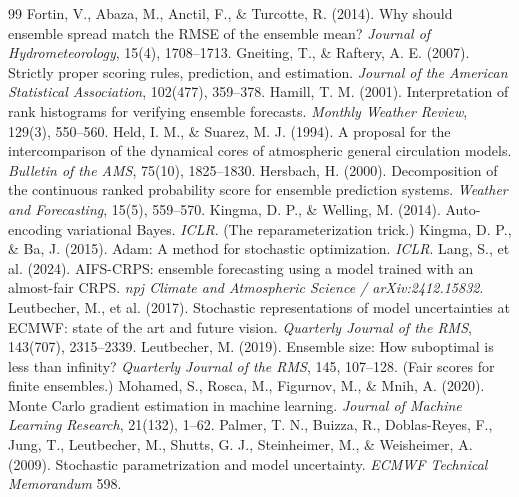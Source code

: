 \documentclass[11pt]{article}
\begin{document}
\begin{thebibliography}{99}
 Fortin, V., Abaza, M., Anctil, F., \&
  Turcotte, R. (2014). Why should ensemble spread match the RMSE of the ensemble
  mean? \emph{Journal of Hydrometeorology}, 15(4), 1708--1713.
 Gneiting, T., \& Raftery, A. E.
  (2007). Strictly proper scoring rules, prediction, and estimation.
  \emph{Journal of the American Statistical Association}, 102(477), 359--378.
 Hamill, T. M. (2001). Interpretation of rank
  histograms for verifying ensemble forecasts. \emph{Monthly Weather Review},
  129(3), 550--560.
 Held, I. M., \& Suarez, M. J.
  (1994). A proposal for the intercomparison of the dynamical cores of atmospheric
  general circulation models. \emph{Bulletin of the AMS}, 75(10), 1825--1830.
 Hersbach, H. (2000). Decomposition of the
  continuous ranked probability score for ensemble prediction systems.
  \emph{Weather and Forecasting}, 15(5), 559--570.
 Kingma, D. P., \& Welling, M.
  (2014). Auto-encoding variational Bayes. \emph{ICLR}. (The reparameterization
  trick.)
 Kingma, D. P., \& Ba, J. (2015).
  Adam: A method for stochastic optimization. \emph{ICLR}.
 Lang, S., et al. (2024). AIFS-CRPS:
  ensemble forecasting using a model trained with an almost-fair CRPS.
  \emph{npj Climate and Atmospheric Science / arXiv:2412.15832}.
 Leutbecher, M., et al. (2017).
  Stochastic representations of model uncertainties at ECMWF: state of the art and
  future vision. \emph{Quarterly Journal of the RMS}, 143(707), 2315--2339.
 Leutbecher, M. (2019). Ensemble size:
  How suboptimal is less than infinity? \emph{Quarterly Journal of the RMS}, 145,
  107--128. (Fair scores for finite ensembles.)
 Mohamed, S., Rosca, M., Figurnov, M.,
  \& Mnih, A. (2020). Monte Carlo gradient estimation in machine learning.
  \emph{Journal of Machine Learning Research}, 21(132), 1--62.
 Palmer, T. N., Buizza, R., Doblas-Reyes,
  F., Jung, T., Leutbecher, M., Shutts, G. J., Steinheimer, M., \& Weisheimer, A.
  (2009). Stochastic parametrization and model uncertainty. \emph{ECMWF Technical
  Memorandum} 598.
\end{thebibliography}
\end{document}
